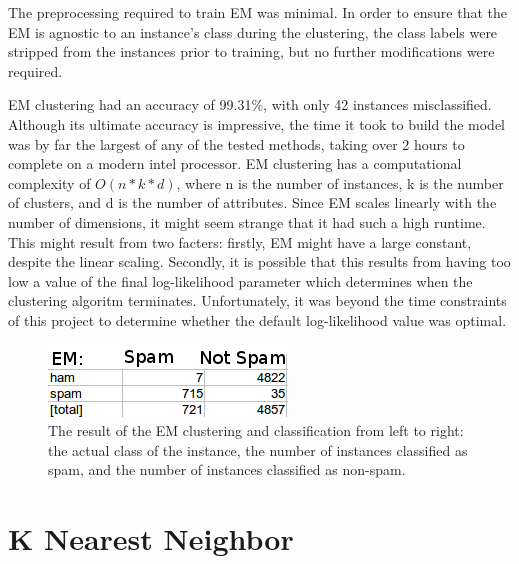 \documentclass[letterpaper, 10 pt, conference]{ieeeconf}  %
\begin{document}
The preprocessing required to train EM was minimal. In order to ensure
that the EM is agnostic to an instance's class during the clustering,
the class labels were stripped from the instances prior to training,
but no further modifications were required.

EM clustering had an accuracy of 99.31\%, with only 42 instances
misclassified. Although its ultimate accuracy is impressive, the time
it took to build the model was by far the largest of any of the tested
methods, taking over 2 hours to complete on a modern intel
processor. EM clustering has a computational complexity of $O(n*k*d)$,
where n is the number of instances, k is the number of clusters, and d
is the number of attributes. Since EM scales linearly with the number
of dimensions, it might seem strange that it had such a high
runtime. This might result from two facters: firstly, EM might have a
large constant, despite the linear scaling. Secondly, it is possible
that this results from having too low a value of the final
log-likelihood parameter which determines when the clustering algoritm
terminates. Unfortunately, it was beyond the time constraints of this
project to determine whether the default log-likelihood value was
optimal.

\begin{figure}[t]
\centering
\includegraphics[width=0.93\columnwidth]{figures/EM.png}
\caption{ The result of the EM clustering and classification from left
  to right: the actual class of the instance, the number of instances
  classified as spam, and the number of instances classified as
  non-spam.  }
\end{figure}


\section{K Nearest Neighbor}
\end{document}
